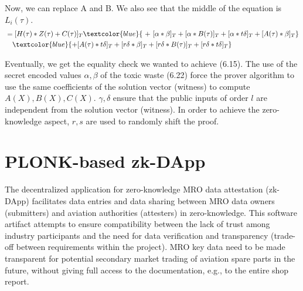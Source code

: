 Now, we can replace A and B. We also see that the middle of the equation is \(L_i(\tau)\).
 \begin{equation*}
     \begin{split}
     &=[H(\tau) * Z(\tau) + C(\tau)]_T \textcolor{blue}{\ +\  [\alpha * \beta]_T + [\alpha * B(\tau)]_T + [\alpha * t\delta]_T + [A(\tau) * \beta]_T} \\
     &\ \ \ \textcolor{blue}{+ [A(\tau) * t\delta]_T + [r\delta * \beta]_T + [r\delta * B(\tau)]_T + [r\delta * t\delta]_T}
     \end{split}
 \end{equation*}

Eventually, we get the equality check we wanted to achieve (6.15). The use of the secret encoded values \(\alpha, \beta\) of the toxic waste (6.22) force the prover algorithm to use the same coefficients of the solution vector (witness) to compute \(A(X), B(X), C(X)\). \(\gamma, \delta\) ensure that the public inputs of order \(l\) are independent from the solution vector (witness). In order to achieve the zero-knowledge aspect, \(r, s\) are used to randomly shift the proof.

\section{PLONK-based zk-DApp}
The decentralized application for zero-knowledge MRO data attestation (zk-DApp) facilitates data entries and data sharing between MRO data owners (submitters) and aviation authorities (attesters) in zero-knowledge. This software artifact attempts to ensure compatibility between the lack of trust among industry participants and the need for data verification and transparency (trade-off between requirements within the project). MRO key data need to be made transparent for potential secondary market trading of aviation spare parts in the future, without giving full access to the documentation, e.g., to the entire shop report.

